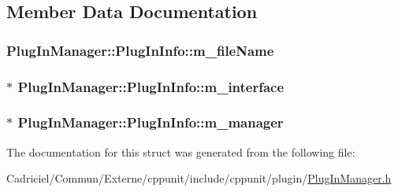 \subsection{Member Data Documentation}
\hypertarget{struct_plug_in_manager_1_1_plug_in_info_ac084e2efe4d9953812eff03966c06988}{
\subsubsection[{m\-\_\-file\-Name}]{ Plug\-In\-Manager\-::\-Plug\-In\-Info\-::m\-\_\-file\-Name}}\label{struct_plug_in_manager_1_1_plug_in_info_ac084e2efe4d9953812eff03966c06988}
\hypertarget{struct_plug_in_manager_1_1_plug_in_info_a306eb58a5d6881b117d6bb9a9ae46589}{
\subsubsection[{m\-\_\-interface}]{$\ast$ Plug\-In\-Manager\-::\-Plug\-In\-Info\-::m\-\_\-interface}}\label{struct_plug_in_manager_1_1_plug_in_info_a306eb58a5d6881b117d6bb9a9ae46589}
\hypertarget{struct_plug_in_manager_1_1_plug_in_info_a1889712db485e16a29c45ecba4780f0a}{
\subsubsection[{m\-\_\-manager}]{$\ast$ Plug\-In\-Manager\-::\-Plug\-In\-Info\-::m\-\_\-manager}}\label{struct_plug_in_manager_1_1_plug_in_info_a1889712db485e16a29c45ecba4780f0a}


The documentation for this struct was generated from the following file\-:\begin{DoxyCompactItemize}
\item 
Cadriciel/\-Commun/\-Externe/cppunit/include/cppunit/plugin/\hyperlink{_plug_in_manager_8h}{Plug\-In\-Manager.\-h}\end{DoxyCompactItemize}
